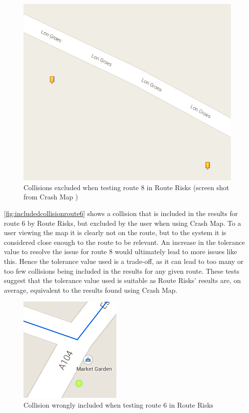 \documentclass[authoryearcitations]{UoYCSproject}
\begin{document}
\begin{figure}
	\center
	\includegraphics[scale=0.5]{excludedcollisions}
	\caption{Collisions excluded when testing route 8 in Route Risks (screen shot from Crash Map \citep{crashmap})}
	\label{fig:excludedcollisionsroute8}
\end{figure}

\autoref{fig:includedcollisionroute6} shows a collision that is included in the results for route 6 by Route Risks, but excluded by the user when using Crash Map. To a user viewing the map it is clearly not on the route, but to the system it is considered close enough to the route to be relevant. An increase in the tolerance value to resolve the issue for route 8 would ultimately lead to more issues like this. Hence the tolerance value used is a trade-off, as it can lead to too many or too few collisions being included in the results for any given route. These tests suggest that the tolerance value used is suitable as Route Risks' results are, on average, equivalent to the results found using Crash Map. 

\begin{figure}
	\center
	\includegraphics[scale=1]{incorrectlyincluded}
	\caption{Collision wrongly included when testing route 6 in Route Risks}
	\label{fig:includedcollisionroute6}
\end{figure}
\end{document}

